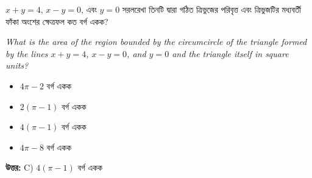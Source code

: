 \documentclass[12pt, a4paper]{article}
\begin{document}
\begin{tcolorbox}[questionbox={প্রশ্ন (Question) 42}]
    \noindent
    $x + y = 4$, $x - y = 0$, এবং $y = 0$ সরলরেখা তিনটি দ্বারা গঠিত ত্রিভুজের পরিবৃত্ত এবং ত্রিভুজটির মধ্যবর্তী ফাঁকা অংশের ক্ষেত্রফল কত বর্গ একক?
    
    \vspace{0.8em}
    \begin{english}
    \noindent\textit{\color{darkgray}
    What is the area of the region bounded by the circumcircle of the triangle formed by the lines $x + y = 4$, $x - y = 0$, and $y = 0$ and the triangle itself in square units?
    }
    \end{english}
\end{tcolorbox}

\begin{itemize}[label={}, leftmargin=1cm, itemsep=0.5em]
    \item[\textbf{A)}] $4\pi - 2$ বর্গ একক
    \item[\textbf{B)}] $2(\pi - 1)$ বর্গ একক
    \item[\textbf{C)}] $4(\pi - 1)$ বর্গ একক
    \item[\textbf{D)}] $4\pi - 8$ বর্গ একক
\end{itemize}

\vspace{0.5em}
\begin{tcolorbox}[answerbox]
    \textbf{\color{success} উত্তর:} C) $4(\pi - 1)$ বর্গ একক
\end{tcolorbox}
\vspace{1em}
\end{document}
